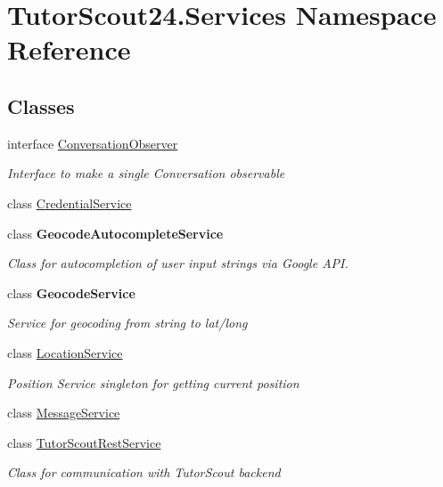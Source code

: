 \hypertarget{namespace_tutor_scout24_1_1_services}{}\section{Tutor\+Scout24.\+Services Namespace Reference}
\label{namespace_tutor_scout24_1_1_services}
\subsection*{Classes}
\begin{DoxyCompactItemize}
\item 
interface \mbox{\hyperlink{interface_tutor_scout24_1_1_services_1_1_conversation_observer}{Conversation\+Observer}}
\begin{DoxyCompactList}\small\item\em Interface to make a single Conversation observable \end{DoxyCompactList}\item 
class \mbox{\hyperlink{class_tutor_scout24_1_1_services_1_1_credential_service}{Credential\+Service}}
\item 
class {\bfseries Geocode\+Autocomplete\+Service}
\begin{DoxyCompactList}\small\item\em Class for autocompletion of user input strings via Google A\+PI. \end{DoxyCompactList}\item 
class {\bfseries Geocode\+Service}
\begin{DoxyCompactList}\small\item\em Service for geocoding from string to lat/long \end{DoxyCompactList}\item 
class \mbox{\hyperlink{class_tutor_scout24_1_1_services_1_1_location_service}{Location\+Service}}
\begin{DoxyCompactList}\small\item\em Position Service singleton for getting current position \end{DoxyCompactList}\item 
class \mbox{\hyperlink{class_tutor_scout24_1_1_services_1_1_message_service}{Message\+Service}}
\item 
class \mbox{\hyperlink{class_tutor_scout24_1_1_services_1_1_tutor_scout_rest_service}{Tutor\+Scout\+Rest\+Service}}
\begin{DoxyCompactList}\small\item\em Class for communication with Tutor\+Scout backend \end{DoxyCompactList}\end{DoxyCompactItemize}
